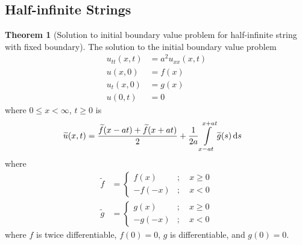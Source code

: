 \documentclass[titlepage, fleqn, a4paper, 12pt, twoside]{article}
\theoremstyle{definition}
\theoremstyle{theorem}
\newtheorem{theorem}{Theorem}
\renewcommand{\tilde}{\widetilde}
\begin{document}
\subsection{Half-infinite Strings}

\begin{theorem}[Solution to initial boundary value problem for half-infinite string with fixed boundary]
	The solution to the initial boundary value problem
	\begin{align*}
		u_{t t}(x,t) &= a^2 u_{x x}(x,t)\\
		u(x,0) &= f(x)\\
		u_t(x,0) &= g(x)\\
		u(0,t) &= 0
	\end{align*}
	where $0 \le x < \infty$, $t \ge 0$ is
	\begin{align*}
		\tilde{u}(x,t) &= \frac{\tilde{f}(x - a t) + \tilde{f}(x + a t)}{2} + \frac{1}{2 a} \int\limits_{x - a t}^{x + a t} \tilde{g}(s) \dif s
	\end{align*}
	where
	\begin{align*}
		\tilde{f} &=
			\begin{cases}
				f(x) &;\quad x \ge 0\\
				-f(-x) &;\quad x < 0
			\end{cases}\\
		\tilde{g} &=
			\begin{cases}
				g(x) &;\quad x \ge 0\\
				-g(-x) &;\quad x < 0
			\end{cases}
	\end{align*}
	where $f$ is twice differentiable, $f(0) = 0$, $g$ is differentiable, and $g(0) = 0$.
	\label{thm:Solution_to_initial_boundary_value_problem_for_half-infinite_string_with_fixed_boundary}
\end{theorem}
\end{document}
